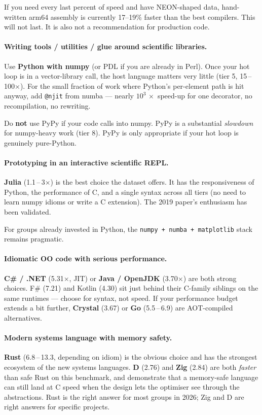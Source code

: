 \documentclass[11pt,a4paper]{article}
\begin{document}
If you need every last percent of speed and have NEON-shaped data,
hand-written arm64 assembly is currently 17--19\% faster than the best
compilers. This will not last. It is also not a recommendation for
production code.

\paragraph{Writing tools / utilities / glue around scientific libraries.}
Use \textbf{Python with numpy} (or PDL if you are already in Perl).
Once your hot loop is in a vector-library call, the host language
matters very little (tier 5, 15\,--\,100$\times$). For the small
fraction of work where Python's per-element path is hit anyway, add
\verb|@njit| from numba --- nearly $10^{3}\,\times$ speed-up for one decorator,
no recompilation, no rewriting.

Do \textbf{not} use PyPy if your code calls into numpy. PyPy is a
substantial \emph{slowdown} for numpy-heavy work (tier 8). PyPy is
only appropriate if your hot loop is genuinely pure-Python.

\paragraph{Prototyping in an interactive scientific REPL.}
\textbf{Julia} (1.1\,--\,3$\times$) is the best choice the dataset
offers. It has the responsiveness of Python, the performance of C,
and a single syntax across all tiers (no need to learn numpy idioms
or write a C extension). The 2019 paper's enthusiasm has been
validated.

For groups already invested in Python, the
\verb|numpy + numba + matplotlib| stack remains pragmatic.

\paragraph{Idiomatic OO code with serious performance.}
\textbf{C\# / .NET} (5.31$\times$, JIT) or \textbf{Java / OpenJDK}
(3.70$\times$) are both strong choices. F\# (7.21) and Kotlin (4.30)
sit just behind their C-family siblings on the same runtimes ---
choose for syntax, not speed. If your performance budget extends a
bit further, \textbf{Crystal} (3.67) or \textbf{Go} (5.5\,--\,6.9) are
AOT-compiled alternatives.

\paragraph{Modern systems language with memory safety.}
\textbf{Rust} (6.8\,--\,13.3, depending on idiom) is the obvious
choice and has the strongest ecosystem of the new systems languages.
\textbf{D} (2.76) and \textbf{Zig} (2.84) are both \emph{faster}
than safe Rust on this benchmark, and demonstrate that a memory-safe
language can still land at C speed when the design lets the
optimiser see through the abstractions. Rust is the right answer for
most groups in 2026; Zig and D are right answers for specific
projects.
\end{document}
